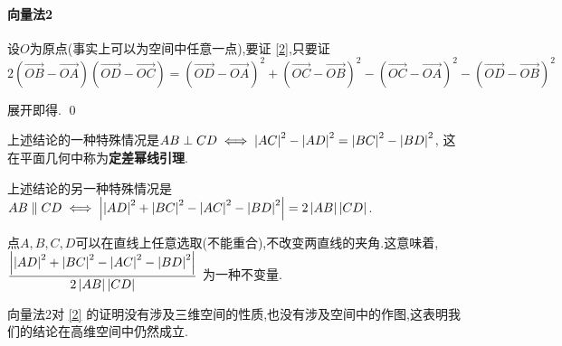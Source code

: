 \documentclass{article}
\begin{document}
\paragraph{向量法2}

设$O$为原点(事实上可以为空间中任意一点),要证 \eqref{2},只要证
\[ 2(\vec{OB} - \vec{OA})(\vec{OD} - \vec{OC}) = (\vec{OD} - \vec{OA})^2 + (\vec{OC} - \vec{OB})^2 -
(\vec{OC} - \vec{OA})^2 - (\vec{OD} - \vec{OB})^2 \]

展开即得. \hfill\qed

\begin{rqq}
    上述结论的一种特殊情况是$AB \perp CD \iff \left\lvert AC \right\rvert^2 - \left\lvert AD \right\rvert^2 = \left\lvert BC \right\rvert^2 - \left\lvert BD \right\rvert^2$,
    这在平面几何中称为\textbf{定差幂线引理}.
\end{rqq}

\begin{rqq}
    上述结论的另一种特殊情况是$AB \parallel CD \iff \left\lvert \left\lvert AD \right\rvert^2 + \left\lvert BC \right\rvert^2 - \left\lvert AC \right\rvert^2 - \left\lvert BD \right\rvert^2 \right\rvert =
    2\left\lvert AB \right\rvert \left\lvert CD \right\rvert$.
\end{rqq}

\begin{rqq}
    点$A, B, C, D$可以在直线上任意选取(不能重合),不改变两直线的夹角.这意味着,
    $\dfrac{\left\lvert \left\lvert AD \right\rvert^2 + \left\lvert BC \right\rvert^2 - \left\lvert AC \right\rvert^2 - \left\lvert BD \right\rvert^2 \right\rvert}{2 \left\lvert AB \right\rvert \left\lvert CD \right\rvert}$
    为一种不变量.
\end{rqq}

\begin{rqq}
    向量法2对 \eqref{2} 的证明没有涉及三维空间的性质,也没有涉及空间中的作图,这表明我们的结论在高维空间中仍然成立.
\end{rqq}
\end{document}
